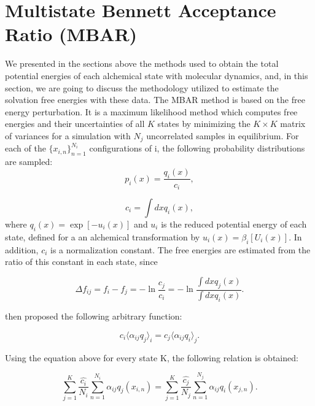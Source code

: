 \documentclass[
	12pt,				%
	openany,			%
	oneside,			%
	a4paper,			%
	english,			%
	brazil				%
	]{abntex2}
\begin{document}
\section{Multistate Bennett Acceptance Ratio (MBAR)}\label{mbar}

We presented in the sections above the methods used to obtain the total potential energies of each alchemical state with molecular dynamics, and, in this section, we are going to discuss the methodology utilized to estimate the solvation free energies with these data. The MBAR method \cite{mbar} is based on the free energy perturbation. It is a maximum likelihood method which computes free energies and their uncertainties of all $K$ states by minimizing the $K \times K$ matrix of variances for a simulation with $N_{j}$ uncorrelated samples in equilibrium. For each of the $\lbrace x_{i,n } \rbrace ^{N_{i}}_{n=1 }$ configurations of i, the following probability distributions are sampled:
\begin{equation}
p_{i}(x) = \frac{q_{i}(x)}{c_{i}},
\end{equation}

\begin{equation}
c_{i} = \int dx q_{i}(x),
\end{equation}
where $q_{i}(x)=\exp[-u_{i}(x)]$ and $u_{i}$ is the reduced potential energy of each state, defined for a an alchemical transformation by $u_{i} (x)= \beta_{i} [U_{i}(x)]$. In addition, $c_{i}$ is a normalization constant.  The free energies are estimated from the ratio of this constant in each state, since

\begin{equation}
\Delta f_{ij} = f_{i} - f_{j} = - \ln \frac{c_{j}}{c_{i}}  = -\ln \frac{\int dx q_{j}(x)}{\int dx q_{i}(x)} .
\label{eqn:mbar1}
\end{equation}

 then proposed the following arbitrary function:

\begin{equation}
c_{i} \langle \alpha _{ij} q_{j} \rangle _{i}  =  c_{j} \langle \alpha _{ij} q_{i} \rangle _{j} .
\end{equation}

Using the equation above for every state  K, the following relation is obtained:

\begin{equation}
\label{eq:mbar1}
\sum_{j=1}^{K} \frac{\hat{c_{i}}}{N_{i}} \sum_{n=1}^{N_{i}} \alpha _{ij} q_{j} (x_{i,n}) =  \sum_{j=1}^{K} \frac{\hat{c_{j}}}{N_{j}} \sum_{n=1}^{N_{j}} \alpha _{ij} q_{i} (x_{j,n}) .
\end{equation}
\end{document}
